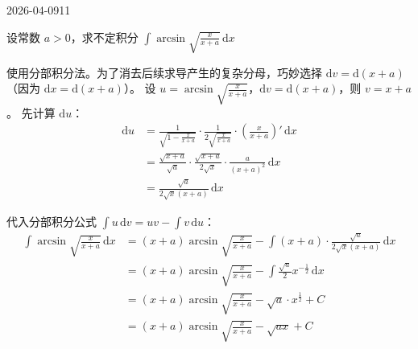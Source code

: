 \begin{mistake}{2026-04-09}{11}

\begin{problemcontent}
设常数 \( a > 0 \)，求不定积分 \(\displaystyle \int \arcsin \sqrt{\frac{x}{x+a}} \, \mathrm{d}x \)
\end{problemcontent}

\begin{solutioncontent}
使用分部积分法。为了消去后续求导产生的复杂分母，巧妙选择 \( \mathrm{d}v = \mathrm{d}(x+a) \)（因为 \(\mathrm{d}x = \mathrm{d}(x+a)\)）。
设 \( u = \arcsin \sqrt{\frac{x}{x+a}} \)，\( \mathrm{d}v = \mathrm{d}(x+a) \)，则 \( v = x+a \)。
先计算 \(\mathrm{d}u\)：
\[
\begin{aligned}
\mathrm{d}u 
&= \frac{1}{\sqrt{1-\frac{x}{x+a}}} \cdot \frac{1}{2\sqrt{\frac{x}{x+a}}} \cdot \left(\frac{x}{x+a}\right)' \, \mathrm{d}x \\
&= \frac{\sqrt{x+a}}{\sqrt{a}} \cdot \frac{\sqrt{x+a}}{2\sqrt{x}} \cdot \frac{a}{(x+a)^2} \, \mathrm{d}x \\
&= \frac{\sqrt{a}}{2\sqrt{x}(x+a)} \, \mathrm{d}x
\end{aligned}
\]

代入分部积分公式 \(\int u\,\mathrm{d}v = uv - \int v\,\mathrm{d}u\)：
\[
\begin{aligned}
\int \arcsin \sqrt{\frac{x}{x+a}} \, \mathrm{d}x 
&= (x+a) \arcsin \sqrt{\frac{x}{x+a}} - \int (x+a) \cdot \frac{\sqrt{a}}{2\sqrt{x}(x+a)} \, \mathrm{d}x \\
&= (x+a) \arcsin \sqrt{\frac{x}{x+a}} - \int \frac{\sqrt{a}}{2} x^{-\frac{1}{2}} \, \mathrm{d}x \\
&= (x+a) \arcsin \sqrt{\frac{x}{x+a}} - \sqrt{a} \cdot x^{\frac{1}{2}} + C \\
&= (x+a) \arcsin \sqrt{\frac{x}{x+a}} - \sqrt{ax} + C
\end{aligned}
\]
\end{solutioncontent}


\end{mistake}
